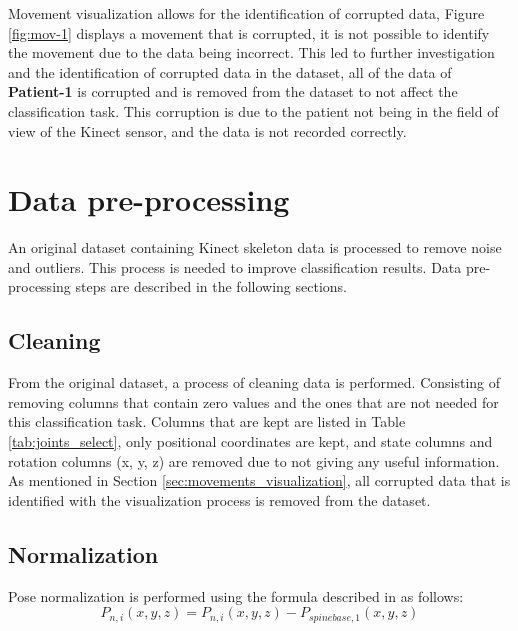         Movement visualization allows for the identification of corrupted data, Figure \ref{fig:mov-1} displays a movement that is corrupted, it is not possible to identify the movement due to the data being incorrect. This led to further investigation and the identification of corrupted data in the dataset, all of the data of \textbf{Patient-1} is corrupted and is removed from the dataset to not affect the classification task. This corruption is due to the patient not being in the field of view of the Kinect sensor, and the data is not recorded correctly.
        
    \section{Data pre-processing}

        An original dataset containing Kinect skeleton data is processed to remove noise and outliers. This process is needed to improve classification results. Data pre-processing steps are described in the following sections.
        
        \subsection{Cleaning}
        
        From the original dataset, a process of cleaning data is performed. Consisting of removing columns that contain zero values and the ones that are not needed for this classification task. Columns that are kept are listed in Table \ref{tab:joints_select}, only positional coordinates are kept, and state columns and rotation columns (x, y, z) are removed due to not giving any useful information. As mentioned in Section \ref{sec:movements_visualization},  all corrupted data that is identified with the visualization process is removed from the dataset.

        \subsection{Normalization}

        Pose normalization is performed using the formula described in \cite{maudsley-barton_comparative_2017} as follows:
        \begin{equation}
            P_{n,i}(x,y,z) = P_{n,i}(x,y,z)-P_{spinebase,1}(x,y,z)
            \label{eq:pose_normalization}
        \end{equation}

